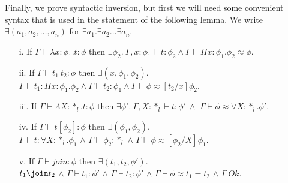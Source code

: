 \noindent
Finally, we prove syntactic inversion, but first we will need some
convenient syntax that is used in the statement of the following
lemma.  We write $\exists (a_1,a_2,\ldots,a_n)$ for $\exists
a_1.\exists a_2\ldots\exists a_n$.
\begin{lemma}
  \label{lemma:inversion_ssfe}
  \begin{itemize}\itemsep2pt
  \item[i.] If $\Gamma \vdash \lambda x:\phi_1.t:\phi$
    then $\exists \phi_2.\ \Gamma,x:\phi_1 \vdash t:\phi_2 \land 
    \Gamma \vdash \Pi x:\phi_1.\phi_2 \approx \phi$.

  \item[ii.] If $\Gamma \vdash t_1\ t_2:\phi$ then $\exists (x,\phi_1, \phi_2).$\\
    $\Gamma \vdash t_1:\Pi x:\phi_1.\phi_2 \land
    \Gamma \vdash t_2:\phi_1 \land \Gamma \vdash \phi \approx
     [t_2/x]\phi_2$.

  \item[iii.] If $\Gamma \vdash \Lambda X:*_l.t:\phi$
    then $\exists \phi'.\ \Gamma,X:*_l \vdash t:\phi'\ \land $
    $\Gamma \vdash \phi \approx \forall X:*_l.\phi'$.

  \item[iv.] If $\Gamma \vdash t[\phi_2]:\phi$ then 
    $\exists (\phi_1, \phi_2)$. \\
    $\Gamma \vdash t:\forall X:*_l.\phi_1$ $\land$
    $\Gamma \vdash \phi_2:*_l$ $\land$ 
    $\Gamma \vdash \phi \approx [\phi_2/X]\phi_1$.

  \item[v.] If $\Gamma \vdash join:\phi$ then
    $\exists (t_1,t_2,\phi')$.\\
    $t_1 \join t_2$ $\land$
    $\Gamma \vdash t_1:\phi'$ $\land$
    $\Gamma \vdash t_2:\phi'$ $\land$
    $\Gamma \vdash \phi \approx t_1 = t_2$ $\land$
    $\Gamma\ Ok$.
  \end{itemize}
\end{lemma}

